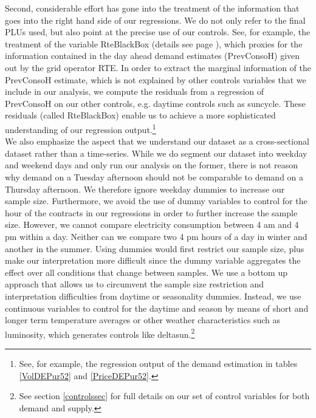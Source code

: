 Second, considerable effort has gone into the treatment of the information that goes into the right hand side of our regressions. We do not only refer to the final PLUs used, but also point at the precise use of our controls. See, for example, the treatment of the variable RteBlackBox (details see page \pageref{RteBlackBox}), which proxies for the information contained in the day ahead demand estimates (PrevConsoH) given out by the grid operator RTE. In order to extract the marginal information of the PrevConsoH estimate, which is not explained by other controls variables that we include in our analysis, we compute the residuals from a regression of PrevConsoH on our other controls, e.g. daytime controls such as suncycle. These residuals (called RteBlackBox) enable us to achieve a more sophisticated understanding of our regression output.\footnote{See, for example, the regression output of the demand estimation in tables \ref{VolDEPur52} and \ref{PriceDEPur52}.}\\

We also emphasize the aspect that we understand our dataset as a cross-sectional dataset rather than a time-series. 
\label{nodummies}
While we do segment our dataset into weekday and weekend days and only run our analysis on the former, there is not reason why demand on a Tuesday afternoon should not be comparable to demand on a Thursday afternoon. We therefore ignore weekday dummies to increase our sample size. Furthermore, we avoid the use of dummy variables to control for the hour of the contracts in our regressions in order to further increase the sample size. However, we cannot compare electricity consumption between 4 am and 4 pm within a day. Neither can we compare two 4 pm hours of a day in winter and another in the summer. Using dummies would first restrict our sample size, plus make our interpretation more difficult since the dummy variable aggregates the effect over all conditions that change between samples. We use a bottom up approach that allows us to circumvent the sample size restriction and interpretation difficulties from daytime or seasonality dummies. Instead, we use continuous variables to control for the daytime and season by means of short and longer term temperature averages or other weather characteristics such as luminosity, which generates controls like deltasun.\footnote{See section \ref{controlssec} for full details on our set of control variables for both demand and supply.} \\

